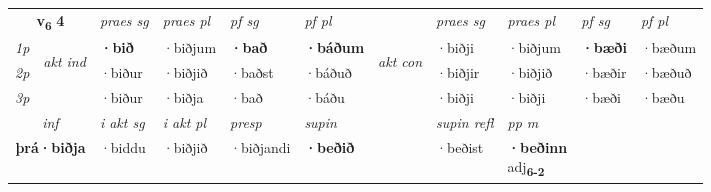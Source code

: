 \noindent
\begin{tabular}{lllllllllll} \toprule
\multicolumn{2}{c}{\textbf{v{\textsubscript{6}}} \Large{\textbf{4}}}  &  \textit{praes sg}  & \textit{praes pl}  &\textit{ pf sg} & \textit{pf pl} &  &  \textit{praes sg}  & \textit{praes pl}  & \textit{pf sg} & \textit{pf pl } \\*
	\cmidrule{3-6} \cmidrule{8-11}
 {\textit{1p}} & \multirow{3}{*}{\begin{turn}{90}\textit{akt ind}\end{turn}} & \textbf{·bið} & ·biðjum & \textbf{·bað} & \textbf{·báðum} & \multirow{3}{*}{\begin{turn}{90}\textit{akt con}\end{turn}} &·biðji & ·biðjum & \textbf{·bæði} & ·bæðum\\*
 {\textit{2p}} &  &  ·biður  & ·biðjið & ·baðst & ·báðuð & & ·biðjir & ·biðjið & ·bæðir & ·bæðuð \\*
{\textit{3p}} &  & ·biður & ·biðja & ·bað & ·báðu & & ·biðji & ·biðji& ·bæði & ·bæðu \\*
\cmidrule{3-6} \cmidrule{8-11}

   \multicolumn{2}{c}{\textit{inf}}  & \textit{i akt sg} & \textit{i akt pl}   & \textit{presp} & \textit{supin} && \textit{supin refl} & \textit{pp m} \\*
  \multicolumn{2}{c}{\textbf{þrá\allowbreak ·biðja}} & ·biddu  & ·biðjið   & ·biðjandi &  \textbf{·beðið} && ·beðist & \specialcell{\textbf{·beðinn} \\ adj\textbf{\textsubscript{6-2}}} \\*
\end{tabular}

